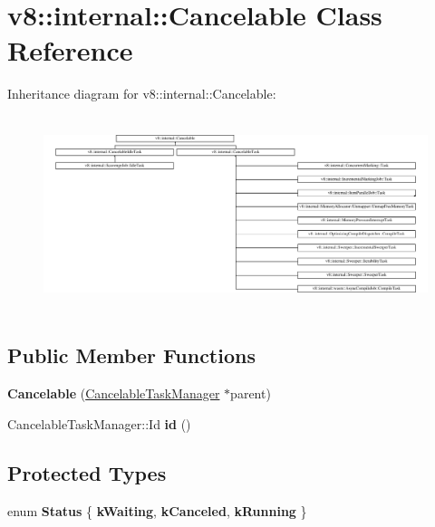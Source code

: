 \hypertarget{classv8_1_1internal_1_1Cancelable}{}\section{v8\+:\+:internal\+:\+:Cancelable Class Reference}
\label{classv8_1_1internal_1_1Cancelable}
Inheritance diagram for v8\+:\+:internal\+:\+:Cancelable\+:\begin{figure}[H]
\begin{center}
\leavevmode
\includegraphics[height=5.728900cm]{classv8_1_1internal_1_1Cancelable}
\end{center}
\end{figure}
\subsection*{Public Member Functions}
\begin{DoxyCompactItemize}
\item 
\mbox{\label{classv8_1_1internal_1_1Cancelable_af72d1fe8c54b45da487af831987f4e5b}} 
{\bfseries Cancelable} (\mbox{\hyperlink{classv8_1_1internal_1_1CancelableTaskManager}{Cancelable\+Task\+Manager}} $\ast$parent)
\item 
\mbox{\label{classv8_1_1internal_1_1Cancelable_a2243742c07e4655ed589aa5ae05c37a2}} 
Cancelable\+Task\+Manager\+::\+Id {\bfseries id} ()
\end{DoxyCompactItemize}
\subsection*{Protected Types}
\begin{DoxyCompactItemize}
\item 
\mbox{\label{classv8_1_1internal_1_1Cancelable_aa3c71a2504630a3ab03c013e0003101a}} 
enum {\bfseries Status} \{ {\bfseries k\+Waiting}, 
{\bfseries k\+Canceled}, 
{\bfseries k\+Running}
 \}
\end{DoxyCompactItemize}
